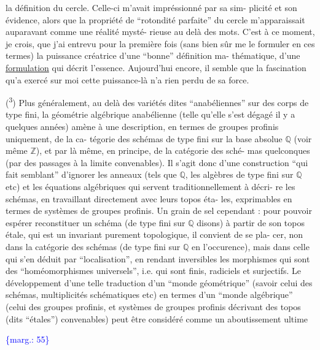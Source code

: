\documentclass[11pt]{article}
\newcommand{\scanpage}[1]{\par\bigskip\noindent{\small\sffamily[scan #1]}\par}
\newcommand{\mspage}[1]{{\small\sffamily[p.\,#1]}}
\newcommand{\margin}[1]{\textcolor{blue}{\{\textsf{marg.:} #1\}}}
\newcommand{\uline}[1]{\underline{#1}}
\begin{document}
la définition du cercle. Celle-ci m'avait impréssionné par sa sim-%
plicité et son évidence, alors que la propriété de ``rotondité
parfaite'' du cercle m'apparaissait auparavant comme une réalité mysté-%
rieuse au delà des mots. C'est à ce moment, je crois, que j'ai
entrevu pour la première fois (sans bien sûr me le formuler en
ces termes) la puissance créatrice d'une ``bonne'' définition ma-%
thématique, d'une \uline{formulation} qui décrit l'essence. Aujourd'hui
encore, il semble que la fascination qu'a exercé sur moi cette
puissance-là n'a rien perdu de sa force.

(\textsuperscript{3}) Plus généralement, au delà des variétés dites ``anabéliennes''
sur des corps de type fini, la géométrie algébrique anabélienne
(telle qu'elle s'est dégagé il y a quelques années) amène à une
description, en termes de groupes profinis uniquement, de la ca-%
tégorie des schémas de type fini sur la base absolue $\mathbb{Q}$ (voir
même $\mathbb{Z}$), et par là même, en principe, de la catégorie des sché-%
mas quelconques (par des passages à la limite convenables). Il
s'agit donc d'une construction ``qui fait semblant'' d'ignorer les
anneaux (tels que $\mathbb{Q}$, les algèbres de type fini sur $\mathbb{Q}$ etc) et
les équations algébriques qui servent traditionnellement à décri-%
re les schémas, en travaillant directement avec leurs topos éta-%
les, exprimables en termes de systèmes de groupes profinis. Un
grain de sel cependant : pour pouvoir espérer reconstituer un
schéma (de type fini sur $\mathbb{Q}$ disons) à partir de son topos étale,
qui est un invariant purement topologique, il convient de se pla-%
cer, non dans la catégorie des schémas (de type fini sur $\mathbb{Q}$ en
l'occurence), mais dans celle qui s'en déduit par ``localisation'',
en rendant inversibles les morphismes qui sont des ``homéomorphismes
universels'', i.e. qui sont finis, radiciels et surjectifs. Le
développement d'une telle traduction d'un ``monde géométrique''
(savoir celui des schémas, multiplicités schématiques etc) en
termes d'un ``monde algébrique'' (celui des groupes profinis, et
systèmes de groupes profinis décrivant des topos (dits ``étales'')
convenables) peut être considéré comme un aboutissement ultime

\margin{55}

\clearpage
\scanpage{119/56}
\mspage{54}
\end{document}
